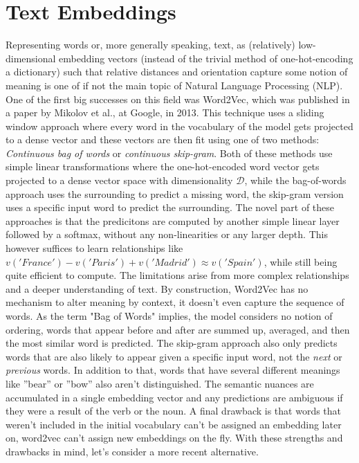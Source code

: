 \documentclass[draft,final]{vutinfth} %
\begin{document}
\section{Text Embeddings}
Representing words or, more generally speaking, text, as (relatively) low-dimensional embedding vectors (instead of the trivial method of one-hot-encoding a dictionary) such that relative distances and orientation capture some notion of meaning is one of if not the main topic of Natural Language Processing (NLP). One of the first big successes on this field was Word2Vec, which was published in a paper by Mikolov et al., at Google, in 2013. This technique uses a sliding window approach where every word in the vocabulary of the model gets projected to a dense vector and these vectors are then fit using one of two methods: \textit{Continuous bag of words} or \textit{continuous skip-gram}. Both of these methods use simple linear transformations where the one-hot-encoded word vector gets projected to a dense vector space with dimensionality $\mathcal{D}$, while the bag-of-words approach uses the surrounding to predict a missing word, the skip-gram version uses a specific input word to predict the surrounding. The novel part of these approaches is that the predicitons are computed by another simple linear layer followed by a softmax, without any non-linearities or any larger depth. \cite{word2vec_preprint} This however suffices to learn relationships like $v('France') - v('Paris') + v('Madrid') \approx v('Spain')$, while still being quite efficient to compute. \cite{word2vec_official} The limitations arise from more complex relationships and a deeper understanding of text. By construction, Word2Vec has no mechanism to alter meaning by context, it doesn't even capture the sequence of words. As the term "Bag of Words" implies, the model considers no notion of ordering, words that appear before and after are summed up, averaged, and then the most similar word is predicted. The skip-gram approach also only predicts words that are also likely to appear given a specific input word, not the \textit{next} or \textit{previous} words. In addition to that, words that have several different meanings like ''bear'' or ''bow'' also aren't distinguished. The semantic nuances are accumulated in a single embedding vector and any predictions are ambiguous if they were a result of the verb or the noun. A final drawback is that words that weren't included in the initial vocabulary can't be assigned an embedding later on, word2vec can't assign new embeddings on the fly. With these strengths and drawbacks in mind, let's consider a more recent alternative. 
\end{document}
